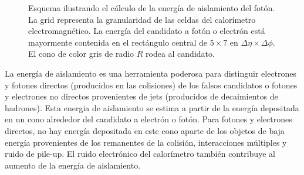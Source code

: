 





\begin{figure}[!htb]
  \centering

  \resizebox{0.5\textwidth}{!}{
    
  }

  \caption{Esquema ilustrando el cálculo de la energía de aislamiento del fotón. La grid representa
    la granularidad de las celdas del calorímetro electromagnético. La energía del candidato a fotón o electrón
    está mayormente contenida en el rectángulo central de $5 \times 7$ en $\Delta\eta \times \Delta\phi$. El
    cono de color gris de radio $R$ rodea al candidato.}
  \label{fig:topoetcone}

\end{figure}


La energía de aislamiento es una herramienta poderosa para distinguir electrones
y fotones directos (producidos en las colisiones) de los falsos candidatos o
fotones y electrones no directos provenientes de jets (producidos de
decaimientos de hadrones). Esta energia de aislamiento se estima a partir de la energía depositada en un
cono alrededor del candidato a electrón o fotón. Para fotones y electrones
directos, no hay energía depositada en este cono aparte de los objetos de baja
energía provenientes de los remanentes de la colisión, interacciones múltiples y
ruido de pile-up. El ruido electrónico del calorímetro también contribuye al
aumento de la energía de aislamiento.

